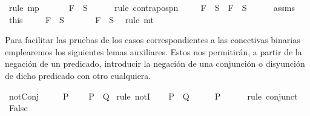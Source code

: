 \begin{isabellebody}
\ {\isacharparenleft}rule\ mp{\isacharparenright}\isanewline
\ \ \isamarkupfalse%
\ \isamarkupfalse%
\ {\isachardoublequoteopen}{\isasymnot}\ {\isacharparenleft}F\ {\isasymnotin}\ S{\isacharparenright}{\isachardoublequoteclose}\isanewline
\ \ \ \ \isamarkupfalse%
\ {\isacharparenleft}rule\ contrapos{\isacharunderscore}pn{\isacharparenright}\isanewline
\ \ \isamarkupfalse%
\ {\isachardoublequoteopen}\isactrlbold {\isasymnot}\ F\ {\isasymin}\ S\ {\isasymlongrightarrow}\ F\ {\isasymnotin}\ S{\isachardoublequoteclose}\isanewline
\ \ \ \ \isamarkupfalse%
\ assms\ \isamarkupfalse%
\ this\isanewline
\ \ \isamarkupfalse%
\ {\isachardoublequoteopen}\isactrlbold {\isasymnot}\ F\ {\isasymnotin}\ S{\isachardoublequoteclose}\isanewline
\ \ \ \ \isamarkupfalse%
\ {\isacartoucheopen}{\isasymnot}\ {\isacharparenleft}F\ {\isasymnotin}\ S{\isacharparenright}{\isacartoucheclose}\ \isamarkupfalse%
\ {\isacharparenleft}rule\ mt{\isacharparenright}\isanewline
{}\isamarkupfalse%
%
\endisatagproof
{\isafoldproof}%
%
\isadelimproof
%
\endisadelimproof
%
\begin{isamarkuptext}%
Para facilitar las pruebas de los casos correspondientes a las
  conectivas binarias emplearemos los siguientes lemas auxiliares. Estos
  nos permitirán, a partir de la negación de un predicado, introducir 
  la negación de una conjunción o disyunción de dicho predicado con otro
  cualquiera.%
\end{isamarkuptext}\isamarkuptrue%
\isamarkupfalse%
\ notConj{}{\isacharcolon}\ \isanewline
\ \ \ {\isachardoublequoteopen}{\isasymnot}\ P{\isachardoublequoteclose}\isanewline
\ \ \ {\isachardoublequoteopen}{\isasymnot}\ {\isacharparenleft}P\ {\isasymand}\ Q{\isacharparenright}{\isachardoublequoteclose}\isanewline
%
\isadelimproof
%
\endisadelimproof
%
\isatagproof
{}\isamarkupfalse%
\ {\isacharparenleft}rule\ notI{\isacharparenright}\isanewline
\ \ \isamarkupfalse%
\ {\isachardoublequoteopen}P\ {\isasymand}\ Q{\isachardoublequoteclose}\isanewline
\ \ \isamarkupfalse%
\ \isamarkupfalse%
\ {\isachardoublequoteopen}P{\isachardoublequoteclose}\isanewline
\ \ \ \ \isamarkupfalse%
\ {\isacharparenleft}rule\ conjunct{}{\isacharparenright}\isanewline
\ \ \isamarkupfalse%
\ {\isachardoublequoteopen}False{\isachardoublequoteclose}\isanewline

\end{isabellebody}
